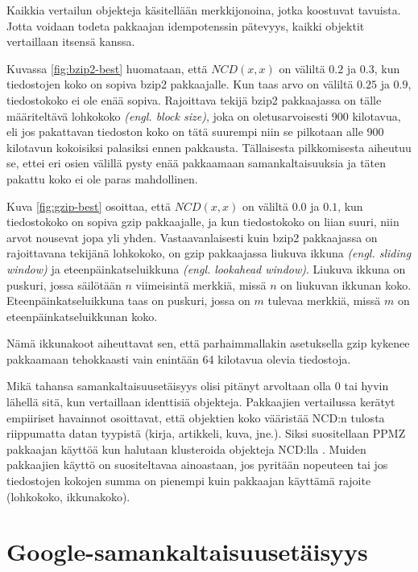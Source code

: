 \documentclass[12pt,finnish,final]{tktltiki2}
\theoremstyle{definition}
\theoremstyle{remark}
\newcommand{\engl}[1]{\emph{(engl. #1)}}
\begin{document}
      Kaikkia vertailun objekteja käsitellään merkkijonoina, jotka koostuvat tavuista.
      Jotta voidaan todeta pakkaajan idempotenssin pätevyys, kaikki objektit vertaillaan itsensä kanssa.

      Kuvassa \ref{fig:bzip2-best} huomataan, että $NCD(x,x)$ on väliltä $0.2$ ja $0.3$, kun tiedostojen koko on sopiva bzip2 pakkaajalle. Kun taas arvo on väliltä $0.25$ ja $0.9$,  tiedostokoko ei ole enää sopiva.
      Rajoittava tekijä bzip2 pakkaajassa on tälle määriteltävä lohkokoko \engl{block size}, joka on oletusarvoisesti 900 kilotavua, eli jos pakattavan tiedoston koko on tätä suurempi niin se pilkotaan alle 900 kilotavun kokoisiksi palasiksi ennen pakkausta.
      Tällaisesta pilkkomisesta aiheutuu se, ettei eri osien välillä pysty enää pakkaamaan samankaltaisuuksia ja täten pakattu koko ei ole paras mahdollinen.

      Kuva \ref{fig:gzip-best} osoittaa, että $NCD(x,x)$ on väliltä $0.0$ ja $0.1$, kun tiedostokoko on sopiva gzip pakkaajalle, ja kun tiedostokoko on liian suuri, niin arvot nousevat jopa yli yhden.
      Vastaavanlaisesti kuin bzip2 pakkaajassa on rajoittavana tekijänä lohkokoko, on gzip pakkaajassa liukuva ikkuna \engl{sliding window} ja eteenpäinkatseluikkuna \engl{lookahead window}.
      Liukuva ikkuna on puskuri, jossa säilötään $n$ viimeisintä merkkiä, missä $n$ on liukuvan ikkunan koko.
      Eteenpäinkatseluikkuna taas on puskuri, jossa on $m$ tulevaa merkkiä, missä $m$ on eteenpäinkatseluikkunan koko.

      Nämä ikkunakoot aiheuttavat sen, että parhaimmallakin asetuksella gzip kykenee pakkaamaan tehokkaasti vain enintään 64 kilotavua olevia tiedostoja.

      Mikä tahansa samankaltaisuusetäisyys olisi pitänyt arvoltaan olla $0$ tai hyvin lähellä sitä, kun vertaillaan identtisiä objekteja.
      Pakkaajien vertailussa kerätyt empiiriset havainnot osoittavat, että objektien koko vääristää NCD:n tulosta riippumatta datan tyypistä (kirja, artikkeli, kuva, jne.).
      Siksi suositellaan PPMZ pakkaajan käyttöä kun halutaan klusteroida objekteja NCD:lla \cite{cebrian2005common}.
      Muiden pakkaajien käyttö on suositeltavaa ainoastaan, jos pyritään nopeuteen tai jos tiedostojen kokojen summa on pienempi kuin pakkaajan käyttämä rajoite (lohkokoko, ikkunakoko).


\section{Google-samankaltaisuusetäisyys} %
  \label{sec:google_samankaltaisuusetaisyys}
\end{document}
